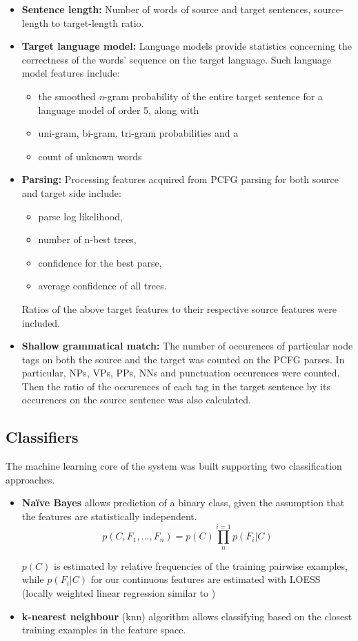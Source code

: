 \documentclass[11pt]{article}
\begin{document}
\begin{itemize}
  \item \textbf{Sentence length:} Number of words of source and target
  sentences, source-length to target-length ratio. 
  \item \textbf{Target language model:} Language models provide statistics
  concerning the correctness of the words' sequence on the target language. Such
  language model features include:
   \begin{itemize} 
     \item the smoothed \textit{n}-gram probability of   the entire target
     sentence for a language model of order 5, along with
     \item uni-gram, bi-gram, tri-gram probabilities and a 
     \item count of unknown words
    \end{itemize}
  \item \textbf{Parsing:} Processing features acquired from PCFG
  parsing \cite{Petrov06learningaccurate} for both source and target side
  include:
  \begin{itemize}
    \item parse log likelihood, 
    \item number of n-best trees, 
    \item confidence for the best parse,
    \item average confidence of all trees.
   \end{itemize}
    Ratios of the above target features to their respective source features
    were included.
  \item \textbf{Shallow grammatical match:} The number of occurences of
  particular node tags on both the source and the target was counted on
  the PCFG parses. In particular, NPs, VPs, PPs, NNs and punctuation occurences
  were counted. Then the ratio of the occurences of each tag in the target
  sentence by its occurences on the source sentence was also calculated.
\end{itemize}

\subsection{Classifiers}
The machine learning core of the system was built supporting two
classification approaches. 
\begin{itemize}
  \item \textbf{Naïve Bayes} allows prediction of a binary class, given the
  assumption that the features are statistically independent. 
  \[
  p(C, F_1, \ldots, F_n) = p(C)\prod_{n}^{i=1}p(F_i|C)
  \]
  
  \(p(C)\) is estimated by relative frequencies of the training pairwise
  examples, while \(p(F_i|C)\) for our continuous features are
  estimated with LOESS (locally weighted linear regression similar to
  )
  \item \textbf{k-nearest neighbour} (knn) algorithm allows classifying based
  on the closest training examples in the feature space. 
\end{itemize}
\end{document}

